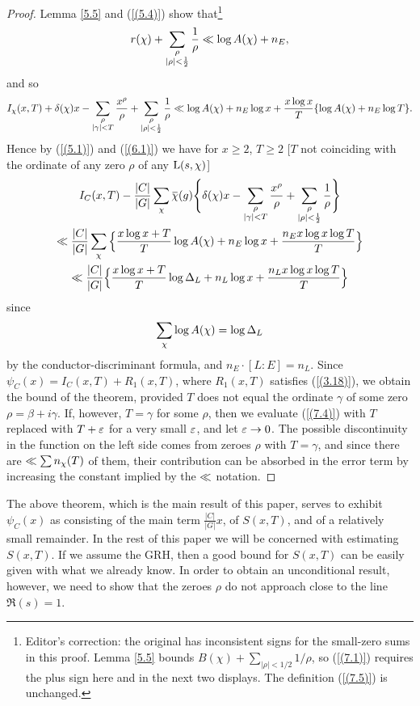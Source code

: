 \documentclass[./main]{subfiles}
\begin{document}
\begin{proof}
Lemma \ref{5.5} and (\ref{(5.4)}) show that\footnote{Editor's correction: the original has inconsistent signs for the small-zero sums in this proof. Lemma \ref{5.5} bounds $B(\chi)+\sum_{|\rho|<1/2}1/\rho$, so (\ref{(7.1)}) requires the plus sign here and in the next two displays. The definition (\ref{(7.5)}) is unchanged.}
\[ r(\chi) + \sum_{\substack{\rho \\ |\rho| < \frac{1}{2}}} \frac{1}{\rho} \ll \log A(\chi) + n_E,
\]
and so 
\begin{multline*}I_{\chi}(x,T) + \delta(\chi)x - \sum_{\substack{\rho \\ |\gamma| < T}} \frac{x^\rho}{\rho} + \sum_{\substack{\rho \\ |\rho| < \frac{1}{2}}} \frac{1}{\rho} 
\ll \log A(\chi) + n_E \log x + \frac{x \log x}{T} \{\log A(\chi) + n_E \log T\}.
\end{multline*}
Hence by (\ref{(5.1)}) and (\ref{(6.1)}) we have for $x \geq 2$, $T \geq 2$ [$T$ not coinciding with the ordinate of any zero $\rho$ of any $\operatorname{L}(s, \chi)$]
\begin{multline*}
    I_C(x,T) - \frac{|C|}{|G|} \sum_{\chi} \xoverline{\chi}(g) \Bigg\{\delta(\chi)x - \sum_{\substack{\rho \\ |\gamma| <T}} \frac{x^{\rho}}{\rho} + \sum_{\substack{\rho \\ |\rho| < \frac{1}{2}}} \frac{1}{\rho} \Bigg\} \\
    \Vinogradov \frac{|C|}{|G|} \sum_{\chi} \Big\{\frac{x \log x + T}{T} \log A(\chi) + n_E \log x + \frac{n_E x \log x \log T}{T}\Big\}\\
    \Vinogradov \frac{|C|}{|G|} \Big\{ \frac{x \log x + T}{T} \log \disc_L  + n_L \log x + \frac{n_L x \log x \log T}{T}\Big\}
\end{multline*}
since 
\[ \sum_{\chi} \log A(\chi) = \log \Delta_L 
\]
by the conductor-discriminant formula, and $n_E \cdot [L \colon E] = n_L$. Since \newline$\psi_{C}(x) = I_C(x,T) + R_{1}(x,T)$, where $R_{1}(x,T)$ satisfies (\ref{(3.18)}), we obtain the bound of the theorem, provided $T$ does not equal the ordinate $\gamma$ of some zero $\rho = \beta + i \gamma$. If, however, $T = \gamma$ for some $\rho$, then we evaluate (\ref{(7.4)}) with $T$ replaced with $T + \varepsilon$ for a very small $\varepsilon$, and let $\varepsilon \to 0$. The possible discontinuity in the function on the left side comes from zeroes $\rho$ with $T = \gamma$, and since there are $\ll \sum n_{\chi}(T)$ of them, their contribution can be absorbed in the error term by increasing the constant implied by the $\ll$ notation.  
\end{proof}
The above theorem, which is the main result of this paper, serves to exhibit $\psi_{C}(x)$ as consisting of the main term $\frac{|C|}{|G|}x$, of $S(x,T)$, and of a relatively small remainder. In the rest of this paper we will be concerned with estimating $S(x,T)$. If we assume the GRH, then a good bound for $S(x,T)$ can be easily given with what we already know. In order to obtain an unconditional result, however, we need to show that the zeroes $\rho$ do not approach close to the line $\Re(s) = 1$.
\end{document}
